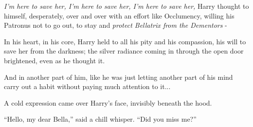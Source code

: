 \emph{I'm here to save her, I'm here to save her, I'm here to save her,} Harry thought to himself, desperately, over and over with an effort like Occlumency, willing his Patronus not to go out, to stay and \emph{protect Bellatrix from the Dementors} -

In his heart, in his core, Harry held to all his pity and his compassion, his will to save her from the darkness; the silver radiance coming in through the open door brightened, even as he thought it.

And in another part of him, like he was just letting another part of his mind carry out a habit without paying much attention to it...

A cold expression came over Harry's face, invisibly beneath the hood.

``Hello, my dear Bella,'' said a chill whisper. ``Did you miss me?''
